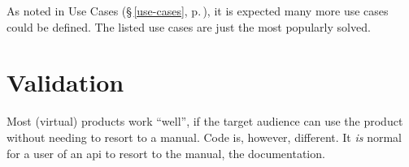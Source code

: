 As noted in Use Cases (§\,\ref{use-cases}, p.\,\pageref{use-cases}), it is
  expected many more use cases could be defined.
The listed use cases are just the most popularly solved.

\section*{Validation}\label{addendum-validation}

Most (virtual) products work ``well'', if the target audience can use the
  product without needing to resort to a manual.
Code is, however, different.
It \emph{is} normal for a user of an \gls{api} to resort to the manual,
  the documentation.

\endgroup
